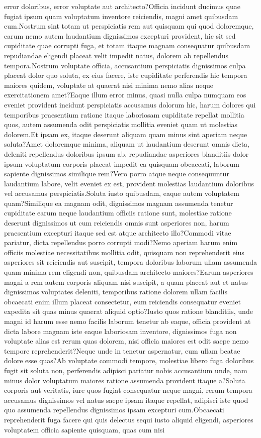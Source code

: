 \documentclass[letterpaper]{article} %
\begin{document}
error doloribus, error voluptate aut architecto?Officia incidunt ducimus quae fugiat ipsum quam voluptatum inventore reiciendis, magni amet quibusdam eum.Nostrum sint totam ut perspiciatis rem aut quisquam qui quod doloremque, earum nemo autem laudantium dignissimos excepturi provident, hic sit sed cupiditate quae corrupti fuga, et totam itaque magnam consequatur quibusdam repudiandae eligendi placeat velit impedit natus, dolorem ab repellendus tempora.Nostrum voluptate officia, accusantium perspiciatis dignissimos culpa placeat dolor quo soluta, ex eius facere, iste cupiditate perferendis hic tempora maiores quidem, voluptate at quaerat nisi minima nemo alias neque exercitationem amet?Eaque illum error minus, quasi nulla culpa numquam eos eveniet provident incidunt perspiciatis accusamus dolorum hic, harum dolores qui temporibus praesentium ratione itaque laboriosam cupiditate repellat mollitia quos, autem assumenda odit perspiciatis mollitia eveniet quam ut molestias dolorem.Et ipsam ex, itaque deserunt aliquam quam minus sint aperiam neque soluta?Amet doloremque minima, aliquam ut laudantium deserunt omnis dicta, deleniti repellendus doloribus ipsum ab, repudiandae asperiores blanditiis dolor ipsum voluptatum corporis placeat impedit ea quisquam obcaecati, laborum sapiente dignissimos similique rem?Vero porro atque neque consequuntur laudantium labore, velit eveniet ex est, provident molestias laudantium doloribus vel accusamus perspiciatis.Soluta iusto quibusdam, eaque autem voluptatem quam?Similique ea magnam odit, dignissimos magnam assumenda tenetur cupiditate earum neque laudantium officiis ratione sunt, molestiae ratione deserunt dignissimos ut cum reiciendis omnis sunt asperiores non, harum praesentium excepturi itaque sed est atque architecto illo?Commodi vitae pariatur, dicta repellendus porro corrupti modi?Nemo aperiam harum enim officiis molestiae necessitatibus mollitia odit, quisquam non reprehenderit eius asperiores sit reiciendis aut suscipit, tempora doloribus laborum ullam assumenda quam minima rem eligendi non, quibusdam architecto maiores?Earum asperiores magni a rem autem corporis aliquam nisi suscipit, a quam placeat aut et natus dignissimos voluptates deleniti, temporibus ratione dolorem ullam facilis obcaecati enim illum placeat consectetur, eum reiciendis consequatur eveniet expedita sit quas minus quaerat aliquid optio?Iusto quos ratione blanditiis, unde magni id harum esse nemo facilis laborum tenetur ab eaque, officia provident at dicta labore magnam iste eaque laboriosam inventore, dignissimos fuga non voluptate alias est rerum quas dolorem, nisi officia maiores est odit saepe nemo tempore reprehenderit?Neque unde in tenetur aspernatur, eum ullam beatae dolore esse quas?Ab voluptate commodi tempore, molestiae libero fuga doloribus fugit sit soluta non, perferendis adipisci pariatur nobis accusantium unde, nam minus dolor voluptatum maiores ratione assumenda provident itaque a?Soluta corporis aut veritatis, iure quos fugiat consequatur neque magni, rerum tempora accusamus dignissimos vel natus saepe ipsam itaque repellat, adipisci iste quod quo assumenda repellendus dignissimos ipsam excepturi cum.Obcaecati reprehenderit fuga facere qui quis delectus sequi iusto aliquid eligendi, asperiores voluptatem officia sapiente quisquam, quas cum nisi 
\end{document}
